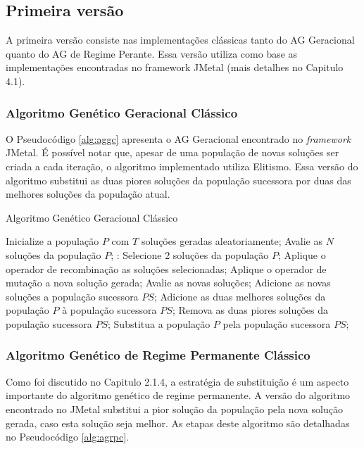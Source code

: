 \subsection{Primeira versão}

A primeira versão consiste nas implementações clássicas tanto do AG Geracional quanto do AG de Regime Perante. Essa versão utiliza como base as implementações encontradas no framework JMetal (mais detalhes no Capitulo 4.1).

\subsubsection{Algoritmo Genético Geracional Clássico}

O Pseudocódigo \ref{alg:aggc} apresenta o AG Geracional encontrado no \textit{framework} JMetal. É possível notar que, apesar de uma população de novas soluções ser criada a cada iteração, o algoritmo implementado utiliza Elitismo. Essa versão do algoritmo substitui as duas piores soluções da população sucessora por duas das melhores soluções da população atual.

\begin{algorithm}
  \caption{Algoritmo Genético Geracional Clássico}
  \label{alg:aggc}
  \begin{algorithmic}
    \State Inicialize a população $P$ com $T$ soluções geradas aleatoriamente;
    \State Avalie as $N$ soluções da população $P$;
       \State:
        \State Selecione 2 soluções da população $P$;
        \State Aplique o operador de recombinação as soluções selecionadas;
        \State Aplique o operador de mutação a nova solução gerada;
        \State Avalie as novas soluções;
        \State Adicione as novas soluções a população sucessora $PS$;
      \EndFor
      \State Adicione as duas melhores soluções da população $P$ à população sucessora $PS$;
      \State Remova as duas piores soluções da população sucessora $PS$;
      \State Substitua a população $P$ pela população sucessora $PS$;
    \EndWhile
  \end{algorithmic}
\end{algorithm}

\subsubsection{Algoritmo Genético de Regime Permanente Clássico}

Como foi discutido no Capitulo 2.1.4, a estratégia de substituição é um aspecto importante do algoritmo genético de regime permanente. A versão do algoritmo encontrado no JMetal substitui a pior solução da população pela nova solução gerada, caso esta solução seja melhor. As etapas deste algoritmo são detalhadas no Pseudocódigo \ref{alg:agrpc}.

